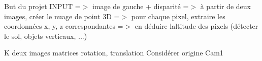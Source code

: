 But du projet I\+N\+P\+UT =$>$ image de gauche + disparité =$>$ à partir de deux images, créer le nuage de point 3D =$>$ pour chaque pixel, extraire les coordonnées x, y, z correspondantes =$>$ en déduire l\textquotesingle{}altitude des pixels (détecter le sol, objets verticaux, ...)

K deux images matrices rotation, translation Considérer origine Cam1 